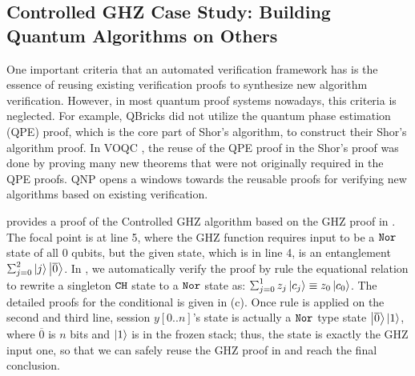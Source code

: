 \subsection{Controlled GHZ Case Study: Building Quantum Algorithms on Others}

One important criteria that an automated verification framework has is the essence of reusing existing verification proofs to synthesize new algorithm verification. However, in most quantum proof systems nowadays, this criteria is neglected. For example, QBricks did not utilize the quantum phase estimation (QPE) proof, which is the core part of Shor's algorithm, to construct their Shor's algorithm proof.
In VOQC \cite{VOQC}, the reuse of the QPE proof in the Shor's proof was done by proving many new theorems that were not originally required in the QPE proofs. QNP opens a windows towards the reusable proofs for verifying new algorithms based on existing verification.

 provides a proof of the Controlled GHZ algorithm based on the GHZ proof in . The focal point is at  line 5, where the GHZ function requires input to be a $\texttt{Nor}$ state of all $0$ qubits, but the given state, which is in line 4, is an entanglement $\scha{2}{}{j}{\ket{\overline{0}}}$. In \qafny, we automatically verify the proof by rule  the equational relation to rewrite a singleton $\texttt{CH}$ state to a $\texttt{Nor}$ state as: $\sch{1}{z_j}{c_j}\equiv z_0\ket{c_0}$. The detailed proofs for the conditional is given in (c). Once rule  is applied on the second and third line, session $y[0..n]$'s state is actually a $\texttt{Nor}$ type state ${\left\vert{\overline{0}}\right\rangle}\left\vert{1}\right\rangle$, where $\overline{0}$ is $n$ bits and $\left\vert{1}\right\rangle$ is in the frozen stack; thus, the state is exactly the GHZ input one, so that we can safely reuse the GHZ proof in  and reach the final conclusion. 

